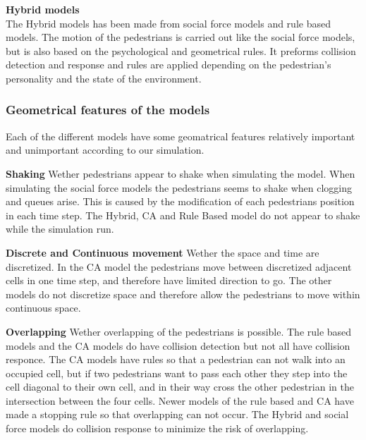 \textbf{Hybrid models}\\
The Hybrid models has been made from social force models and rule based models. 
The motion of the pedestrians is carried out like the social force models, but is also based 
on the psychological and geometrical rules. It preforms collision detection and response and rules 
are applied depending on the pedestrian's personality and the state of the environment. 
\cite{Comparison}
\\

\subsubsection{Geometrical features of the models}
Each of the different models have some geomatrical features relatively important and 
unimportant according to our simulation.

\textbf{Shaking} Wether pedestrians appear to shake when simulating the model. When 
simulating the social force models the pedestrians seems to shake when clogging and 
queues arise. This is caused by the modification of each pedestrians position in each 
time step. The Hybrid, CA and Rule Based model do not appear to shake while the simulation run.

\textbf{Discrete and Continuous movement} Wether the space and time are discretized. 
In the CA model the pedestrians move between discretized adjacent cells in one time step, 
and therefore have limited direction to go. The other models do not discretize space and 
therefore allow the pedestrians to move within continuous space.
 
\textbf{Overlapping} Wether overlapping of the pedestrians is possible. The rule 
based models and the CA models do have collision detection but not all have collision 
responce. The CA models have rules so that a pedestrian can not walk into an occupied 
cell, but if two pedestrians want to pass each other they step into the cell diagonal 
to their own cell, and in their way cross the other pedestrian in the intersection 
between the four cells. Newer models of the rule based and CA have made a stopping 
rule so that overlapping can not occur. The Hybrid and social force models do collision 
response to minimize the risk of overlapping. \cite{Comparison}

